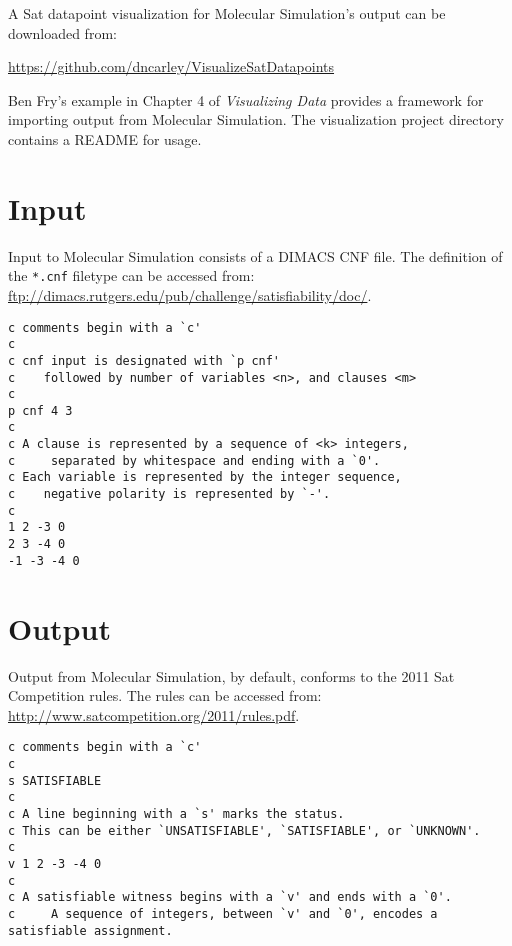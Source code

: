 
A {\sc Sat} datapoint visualization for Molecular Simulation's output can be downloaded from:

\url{https://github.com/dncarley/VisualizeSatDatapoints}

\noindent Ben Fry's example in Chapter 4 of \textit{Visualizing Data} \cite{fryVisualizingData} provides a framework for importing output from Molecular Simulation.  The visualization project directory contains a README for usage.  

			
	\section{Input}
	\label{inputSection}
	

Input to Molecular Simulation consists of a DIMACS CNF file. The definition of the \texttt{*.cnf} filetype can be accessed from: \url{ftp://dimacs.rutgers.edu/pub/challenge/satisfiability/doc/}.		

\begin{verbatim}
c comments begin with a `c'
c
c cnf input is designated with `p cnf'
c    followed by number of variables <n>, and clauses <m>
c
p cnf 4 3
c
c A clause is represented by a sequence of <k> integers,
c     separated by whitespace and ending with a `0'.
c Each variable is represented by the integer sequence, 
c    negative polarity is represented by `-'.
c
1 2 -3 0
2 3 -4 0
-1 -3 -4 0
\end{verbatim}
		
	\section{Output}
	\label{outputSection}
	

Output from Molecular Simulation, by default, conforms to the 2011 {\sc Sat} Competition rules.  The rules can be accessed from: \url{http://www.satcompetition.org/2011/rules.pdf}.


\begin{verbatim}
c comments begin with a `c'
c
s SATISFIABLE
c
c A line beginning with a `s' marks the status.
c This can be either `UNSATISFIABLE', `SATISFIABLE', or `UNKNOWN'.
c
v 1 2 -3 -4 0
c
c A satisfiable witness begins with a `v' and ends with a `0'.
c     A sequence of integers, between `v' and `0', encodes a satisfiable assignment.
\end{verbatim}

